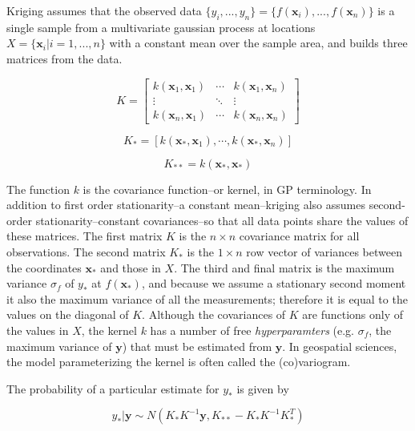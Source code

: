 \documentclass[draft]{article}
\begin{document}
Kriging assumes that the observed data $\{y_i, ..., y_n\}=\{f(\bm{x}_i), ..., f(\bm{x}_n)\}$ is a single sample from a multivariate gaussian process at locations $X=\{\bm{x}_i | i=1, ..., n\}$ %
with a constant mean over the sample area, and builds three matrices from the data.

\[K=
  \begin{bmatrix}
    k(\bm{x}_1, \bm{x}_1) & \cdots & k(\bm{x}_1, \bm{x}_n) \\
    \vdots                & \ddots & \vdots \\
    k(\bm{x}_n, \bm{x}_1) & \cdots & k(\bm{x}_n, \bm{x}_n)
  \end{bmatrix}
\]

\[K_*=[k(\bm{x}_*, \bm{x}_1), \cdots, k(\bm{x}_*, \bm{x}_n)]\]

\[K_{**}=k(\bm{x}_*, \bm{x}_*)\]

The function $k$ is the covariance function--or kernel, in GP terminology.  In addition to first order stationarity--a constant mean--kriging also assumes second-order stationarity--constant covariances--so that all data points share the values of these matrices.  The first matrix $K$ is the $n \times n$ covariance matrix for all observations.  The second matrix $K_*$ is the $1 \times n$ row vector of variances between the coordinates $\bm{x}_*$ and those in $X$.  The third and final matrix is the maximum variance $\sigma_{f}$ of $y_*$ at $f(\bm{x}_*)$, and because we assume a stationary second moment it also the maximum variance of all the measurements; therefore it is equal to the values on the diagonal of $K$.  Although the covariances of $K$ are functions only of the values in $X$, the kernel $k$ has a number of free {\em hyperparamters} (e.g. $\sigma_f$, the maximum variance of $\bm{y}$) that must be estimated from $\bm{y}$.  In geospatial sciences, the model parameterizing the kernel is often called the (co)variogram.

The probability of a particular estimate for $y_*$ is given by 

\[y_* | \bm{y} \sim N(K_*K^{-1}\bm{y}, K_{**}-K_*K^{-1}K_*^T)\]
\end{document}
